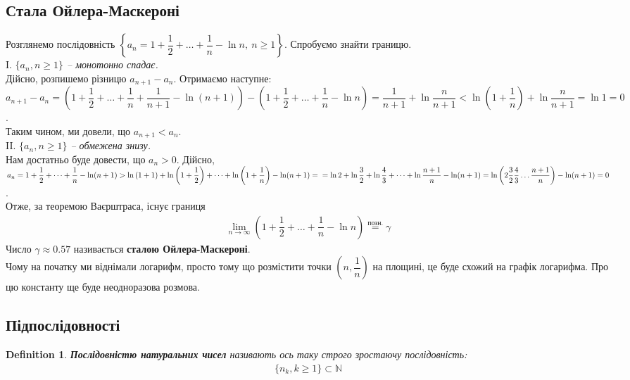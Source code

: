 \documentclass[a4paper, 14pt]{article}
\theoremstyle{theoremdd}
\theoremstyle{theoremdd}
\newtheorem{definition}[theorem]{Definition}
\theoremstyle{theoremdd}
\theoremstyle{theoremdd}
\theoremstyle{theoremdd}
\theoremstyle{theoremdd}
\theoremstyle{theoremdd}
\theoremstyle{theoremdd}
\begin{document}
	\subsection{Стала Ойлера-Маскероні}
	Розглянемо послідовність $\left\{ a_n = 1 + \dfrac{1}{2} + \dots + \dfrac{1}{n} - \ln n,\ n \geq 1 \right\}$. Спробуємо знайти границю.
	\bigskip \\
	I. \textit{$\{a_n, n \geq 1\}$ -- монотонно спадає.}\\
	Дійсно, розпишемо різницю $a_{n+1} - a_n$. Отримаємо наступне:\\
	$a_{n+1} - a_{n} = \left( 1 + \dfrac{1}{2} + \dots + \dfrac{1}{n} + \dfrac{1}{n+1} - \ln (n+1) \right) - \left( 1 + \dfrac{1}{2} + \dots + \dfrac{1}{n} - \ln n \right) = \dfrac{1}{n+1} + \ln \dfrac{n}{n+1} < \ln\left( 1 + \dfrac{1}{n} \right) + \ln \dfrac{n}{n+1} = \ln 1 = 0$.\\
	Таким чином, ми довели, що $a_{n+1} < a_n$.
	\bigskip \\
	II. \textit{$\{a_n,n \geq 1\}$ -- обмежена знизу.}\\
	Нам достатньо буде довести, що $a_n > 0$. Дійсно,\\
	$a_n = 1 + \dfrac{1}{2} + \dots + \dfrac{1}{n} - \ln (n+1) > \ln \left( 1 + 1\right) + \ln\left( 1 + \dfrac{1}{2}\right) + \dots + \ln\left( 1 + \dfrac{1}{n}\right) - \ln(n+1) =\\ = \ln 2 + \ln \dfrac{3}{2} + \ln \dfrac{4}{3} + \dots + \ln \dfrac{n+1}{n} - \ln (n+1) = \ln \left( 2 \dfrac{3}{2} \dfrac{4}{3} \dots \dfrac{n+1}{n} \right) - \ln (n+1) = 0$.\\
	Отже, за теоремою Ваєрштраса, існує границя
	\begin{align*}
	\lim_{n \to \infty} \left( 1 + \dfrac{1}{2} + \dots + \dfrac{1}{n} - \ln n \right) \overset{\text{позн.}}{=} \gamma
	\end{align*}
	Число $\gamma \approx 0.57$ називається \textbf{сталою Ойлера-Маскероні}.\\
	Чому на початку ми віднімали логарифм, просто тому що розмістити точки $\left(n, \dfrac{1}{n}\right)$ на площині, це буде схожий на графік логарифма. Про цю константу ще буде неодноразова розмова.
	
	\subsection{Підпослідовності}
	\begin{definition}
	\textbf{Послідовністю натуральних чисел} називають ось таку строго зростаючу послідовність:
	\begin{align*}
	\{ n_k, k \geq 1 \} \subset \mathbb{N}
	\end{align*}
	\end{definition}
	
\end{document}
